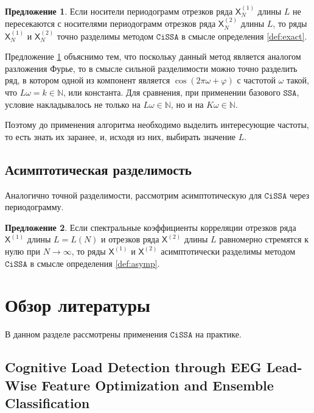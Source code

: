 \documentclass[12pt, specialist, subf
]{disser}
\theoremstyle{definition}
\newcommand{\SSA}{\texttt{SSA}}
\newcommand{\CISSA}{\texttt{CiSSA}}
\newcommand{\TS}{\mathsf{X}}
\newtheorem{proposition}{Предложение}
\begin{document}
\begin{proposition}
	\label{def:exact_cissa}
	Если носители периодограмм отрезков ряда \( \TS_N^{(1)} \) длины \( L \) не пересекаются с носителями периодограмм отрезков ряда \( \TS_N^{(2)} \) длины \( L \), то ряды \( \TS_N^{(1)} \) и \( \TS_N^{(2)} \) точно разделимы методом $\CISSA$ в смысле определения \ref{def:exact}.
\end{proposition}


Предложение \ref{def:exact_cissa} объяснимо тем, что поскольку данный метод является аналогом разложения Фурье, то в смысле сильной разделимости можно точно разделить ряд, в котором одной из компонент является $\cos(2\pi \omega + \varphi)$ с частотой $\omega$ такой, что $L\omega = k \in \mathbb N$, или константа. Для сравнения, при применении базового $\SSA$, условие накладывалось не только на $L\omega \in \mathbb N$, но и на $K\omega \in \mathbb N$.

Поэтому до применения алгоритма необходимо выделить интересующие частоты, то есть знать их заранее, и, исходя из них, выбирать значение $L$.

\subsection{Асимптотическая разделимость}

Аналогично точной разделимости, рассмотрим асимптотическую для $\CISSA$ через периодограмму.

\begin{proposition}
	\label{def:asymp_cissa}
	Если спектральные коэффициенты корреляции отрезков ряда \( \TS^{(1)} \) длины \( L = L(N) \) и отрезков ряда \( \TS^{(2)} \) длины \( L \) равномерно стремятся к нулю при \( N \to \infty \), то ряды \( \TS^{(1)} \) и \( \TS^{(2)} \) асимптотически разделимы методом $\CISSA$ в смысле определения \ref{def:asymp}.
\end{proposition}





\section{Обзор литературы}


В данном разделе рассмотрены применения $\CISSA$ на практике.

\subsection{Cognitive Load Detection through EEG Lead-Wise Feature Optimization and Ensemble Classification}
\end{document}
